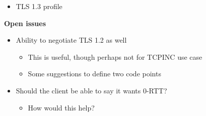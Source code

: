 \documentclass[helvetica]{seminar}
\newcommand{\heading}[1]{%
  \begin{center} 
    \large\bf 
    #1 
  \end{center} 
  \vspace{.4 in}}
\begin{document}
\begin{itemize}
\item TLS 1.3 profile
\end{itemize}


\begin{slide}
\heading{Open issues}

\begin{itemize}
\item Ability to negotiate TLS 1.2 as well
  \begin{itemize}
  \item This is useful, though perhaps not for TCPINC use case
  \item Some suggestions to define two code points
  \end{itemize}

\item Should the client be able to say it wants 0-RTT?
  \begin{itemize}
  \item How would this help?
  \end{itemize}
\end{itemize}

\end{slide}
\end{document}
